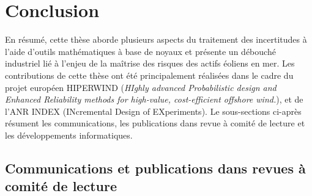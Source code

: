 \section*{Conclusion}

En résumé, cette thèse aborde plusieurs aspects du traitement des incertitudes à l'aide d'outils mathématiques à base de noyaux et présente un débouché industriel lié à l'enjeu de la maîtrise des risques des actifs éoliens en mer. Les contributions de cette thèse ont été principalement réalisées dans le cadre du projet européen HIPERWIND (\textit{HIghly advanced Probabilistic design and Enhanced Reliability methods for high-value, cost-efficient offshore wind.}), et de l'ANR INDEX (INcremental Design of EXperiments). Le sous-sections ci-après résument les communications, les publications dans revue à comité de lecture et les développements informatiques.

\subsection*{Communications et publications dans revues à comité de lecture}

